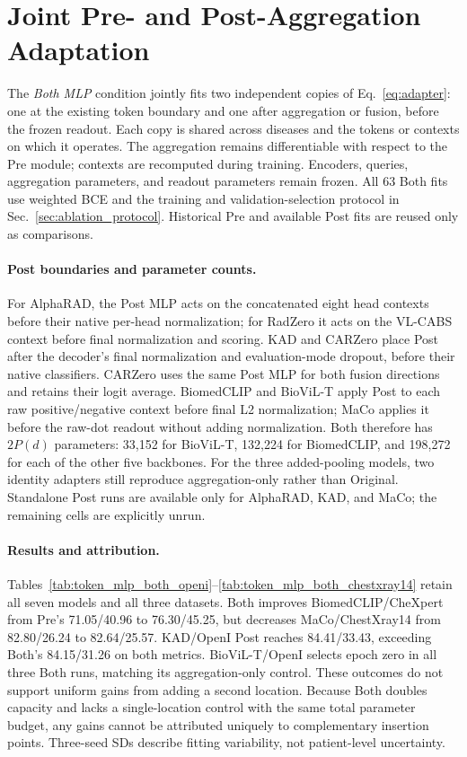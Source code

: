 \onecolumn
\section{Joint Pre- and Post-Aggregation Adaptation}
\label{app:both_mlp}
The \emph{Both MLP} condition jointly fits two independent copies of Eq.~\eqref{eq:adapter}: one at the existing token boundary and one after aggregation or fusion, before the frozen readout. Each copy is shared across diseases and the tokens or contexts on which it operates. The aggregation remains differentiable with respect to the Pre module; contexts are recomputed during training. Encoders, queries, aggregation parameters, and readout parameters remain frozen. All 63 Both fits use weighted BCE and the training and validation-selection protocol in Sec.~\ref{sec:ablation_protocol}. Historical Pre and available Post fits are reused only as comparisons.

\paragraph{Post boundaries and parameter counts.}
For AlphaRAD, the Post MLP acts on the concatenated eight head contexts before their native per-head normalization; for RadZero it acts on the VL-CABS context before final normalization and scoring. KAD and CARZero place Post after the decoder's final normalization and evaluation-mode dropout, before their native classifiers. CARZero uses the same Post MLP for both fusion directions and retains their logit average. BiomedCLIP and BioViL-T apply Post to each raw positive/negative context before final L2 normalization; MaCo applies it before the raw-dot readout without adding normalization. Both therefore has $2P(d)$ parameters: 33,152 for BioViL-T, 132,224 for BiomedCLIP, and 198,272 for each of the other five backbones. For the three added-pooling models, two identity adapters still reproduce aggregation-only rather than Original. Standalone Post runs are available only for AlphaRAD, KAD, and MaCo; the remaining cells are explicitly unrun.

\paragraph{Results and attribution.}
Tables~\ref{tab:token_mlp_both_openi}--\ref{tab:token_mlp_both_chestxray14} retain all seven models and all three datasets. Both improves BiomedCLIP/CheXpert from Pre's 71.05/40.96 to 76.30/45.25, but decreases MaCo/ChestXray14 from 82.80/26.24 to 82.64/25.57. KAD/OpenI Post reaches 84.41/33.43, exceeding Both's 84.15/31.26 on both metrics. BioViL-T/OpenI selects epoch zero in all three Both runs, matching its aggregation-only control. These outcomes do not support uniform gains from adding a second location. Because Both doubles capacity and lacks a single-location control with the same total parameter budget, any gains cannot be attributed uniquely to complementary insertion points. Three-seed SDs describe fitting variability, not patient-level uncertainty.

